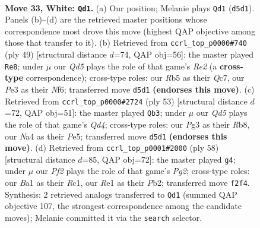 \documentclass[11pt]{article}
\begin{document}
\clearpage

\begin{figure}[p]\centering
\begin{subfigure}{0.46\textwidth}\centering
\resizebox{\linewidth}{!}{%
\newchessgame
\chessboard[
  setfen={1rb2k2/1p2q2p/r7/1R1Q2p1/N3n3/4P1P1/P4PKP/B3R3 w - - 1 33},
  showmover=false,
  pgfstyle=straightmove, color=movearrow, markmove={d5-d1}
]}
\caption{}
\end{subfigure}\hfill
\begin{subfigure}{0.46\textwidth}\centering
\resizebox{\linewidth}{!}{%
\newchessgame
\chessboard[
  setfen={6k1/ppq1rpp1/5n1p/2P1Nb2/3Q1P2/5B1P/P5P1/2R3K1 b - - 0 25},
  showmover=false,
  pgfstyle=straightmove, color=movearrow, markmove={e7-e8}
]}
\caption{}
\end{subfigure}
\\[4pt]
\begin{subfigure}{0.46\textwidth}\centering
\resizebox{\linewidth}{!}{%
\newchessgame
\chessboard[
  setfen={1r3r1k/6pp/3p4/3qp1b1/R7/3B1P2/1P2Q1PP/5R1K b - - 1 27},
  showmover=false,
  pgfstyle=straightmove, color=movearrow, markmove={d5-b3}
]}
\caption{}
\end{subfigure}\hfill
\begin{subfigure}{0.46\textwidth}\centering
\resizebox{\linewidth}{!}{%
\newchessgame
\chessboard[
  setfen={3r4/p4rpk/3Pn1q1/3QRb1p/8/P3BP1P/1P4P1/2R4K w - - 1 30},
  showmover=false,
  pgfstyle=straightmove, color=movearrow, markmove={g2-g4}
]}
\caption{}
\end{subfigure}
\caption{\textbf{Move 33, White: \texttt{Qd1}.} (a) Our position; Melanie plays \texttt{Qd1} (\texttt{d5d1}). Panels (b)--(d) are the retrieved master positions whose correspondence most drove this move (highest QAP objective among those that transfer to it). (b) Retrieved from \texttt{ccrl\_top\_p0000\#740} (ply 49) [structural distance $d$=74, QAP obj=56]: the master played \texttt{Re8}; under $\mu$ our \emph{Qd5} plays the role of that game's \emph{Re2} (a \textbf{cross-type} correspondence); cross-type roles: our \emph{R}b5 as their \emph{Q}c7, our \emph{P}e3 as their \emph{N}f6; transferred move \texttt{d5d1} \textbf{(endorses this move)}. (c) Retrieved from \texttt{ccrl\_top\_p0000\#2724} (ply 53) [structural distance $d$=72, QAP obj=51]: the master played \texttt{Qb3}; under $\mu$ our \emph{Qd5} plays the role of that game's \emph{Qd4}; cross-type roles: our \emph{P}g3 as their \emph{R}b8, our \emph{N}a4 as their \emph{P}e5; transferred move \texttt{d5d1} \textbf{(endorses this move)}. (d) Retrieved from \texttt{ccrl\_top\_p0001\#2000} (ply 58) [structural distance $d$=85, QAP obj=72]: the master played \texttt{g4}; under $\mu$ our \emph{Pf2} plays the role of that game's \emph{Pg2}; cross-type roles: our \emph{B}a1 as their \emph{R}c1, our \emph{R}e1 as their \emph{P}b2; transferred move \texttt{f2f4}. Synthesis: 2 retrieved analogs transferred to \texttt{Qd1} (summed QAP objective 107, the strongest correspondence among the candidate moves); Melanie committed it via the \texttt{search} selector.}
\label{fig:thought-m64}
\end{figure}
\end{document}
